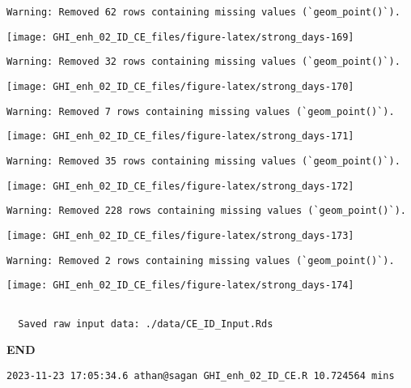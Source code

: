 \documentclass[
  10pt,
  a4paper,oneside]{article}
\begin{document}
\begin{verbatim}
Warning: Removed 62 rows containing missing values (`geom_point()`).
\end{verbatim}

\begin{center}\texttt{[image: GHI\_enh\_02\_ID\_CE\_files/figure-latex/strong\_days-169]} \end{center}

\begin{verbatim}
Warning: Removed 32 rows containing missing values (`geom_point()`).
\end{verbatim}

\begin{center}\texttt{[image: GHI\_enh\_02\_ID\_CE\_files/figure-latex/strong\_days-170]} \end{center}

\begin{verbatim}
Warning: Removed 7 rows containing missing values (`geom_point()`).
\end{verbatim}

\begin{center}\texttt{[image: GHI\_enh\_02\_ID\_CE\_files/figure-latex/strong\_days-171]} \end{center}

\begin{verbatim}
Warning: Removed 35 rows containing missing values (`geom_point()`).
\end{verbatim}

\begin{center}\texttt{[image: GHI\_enh\_02\_ID\_CE\_files/figure-latex/strong\_days-172]} \end{center}

\begin{verbatim}
Warning: Removed 228 rows containing missing values (`geom_point()`).
\end{verbatim}

\begin{center}\texttt{[image: GHI\_enh\_02\_ID\_CE\_files/figure-latex/strong\_days-173]} \end{center}

\begin{verbatim}
Warning: Removed 2 rows containing missing values (`geom_point()`).
\end{verbatim}

\begin{center}\texttt{[image: GHI\_enh\_02\_ID\_CE\_files/figure-latex/strong\_days-174]} \end{center}

\begin{verbatim}

  Saved raw input data: ./data/CE_ID_Input.Rds 
\end{verbatim}

\textbf{END}

\begin{verbatim}
2023-11-23 17:05:34.6 athan@sagan GHI_enh_02_ID_CE.R 10.724564 mins
\end{verbatim}
\end{document}
